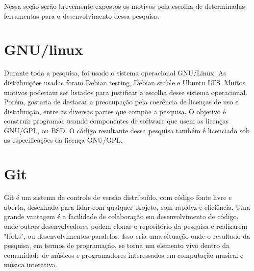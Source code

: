 \documentclass[draft]{ppgmus}
\begin{document}

















Nessa seção serão brevemente expostos os motivos pela escolha de determinadas ferramentas para
o desenvolvimento dessa pesquisa.


\section{GNU/linux}

Durante toda a pesquisa, foi usado o sistema operacional GNU/Linux.
As distribuições usadas foram Debian testing, Debian stable e Ubuntu LTS.
Muitos motivos poderiam ser listados para justificar a escolha desse sistema
operacional. Porém, gostaria de destacar a preocupação pela coerência de licenças
de uso e distribuição, entre as diversas partes que compõe a pesquisa.
O objetivo é construir programas usando componentes de software que usem as licenças GNU/GPL, ou 
BSD. O código resultante dessa pesquisa também é licenciado sob as especificações
da licença GNU/GPL.



\section{Git}

Git é um sistema de controle de versão distribuído, com código fonte livre e aberta, desenhado para lidar com qualquer
projeto, com rapidez e eficiência.
Uma grande vantagem é a facilidade de colaboração em desenvolvimento de código, onde outros desenvolvedores
podem clonar o repositório da pesquisa e realizarem "forks", ou desenvolvimentos paralelos. Isso cria uma situação 
onde o resultado da pesquisa, em termos de programação, se torna um elemento vivo dentro da comunidade de músicos e 
programadores interessados em computação musical e música interativa.
\end{document}
